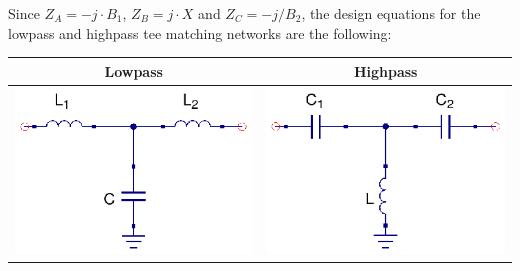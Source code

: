\noindent Since $Z_A = -j\cdot B_1$, $Z_B = j\cdot X$ and $Z_C = -j/B_2$, the design equations for the lowpass and highpass tee matching networks are the following:

\begin{table}[H]
  \centering
  \begin{tabular}{ | c | c | }
    \hline
    Lowpass & Highpass\\ \hline
    \begin{minipage}{.4\textwidth}
      \includegraphics[width=\linewidth]{./images/Synthesis/Impedance_Matching/Lowpass-Tee}
    \end{minipage}
    &
    \begin{minipage}{.4\textwidth}
      \includegraphics[width=\linewidth]{./images/Synthesis/Impedance_Matching/Highpass-Tee}
    \end{minipage}

\end{tabular}
\end{table}
